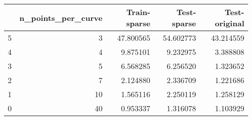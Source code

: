 \begin{tabular}{lrrrr}
\toprule
 & n_points_per_curve & Train-sparse & Test-sparse & Test-original \\
\midrule
5 & 3 & 47.800565 & 54.602773 & 43.214559 \\
4 & 4 & 9.875101 & 9.232975 & 3.388808 \\
3 & 5 & 6.568285 & 6.256520 & 1.323652 \\
2 & 7 & 2.124880 & 2.336709 & 1.221686 \\
1 & 10 & 1.565116 & 2.250119 & 1.258129 \\
0 & 40 & 0.953337 & 1.316078 & 1.103929 \\
\bottomrule
\end{tabular}
